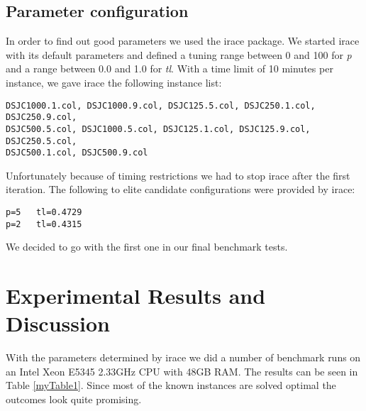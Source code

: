 \documentclass[a4paper]{scrartcl}
\begin{document}
\subsection{Parameter configuration}

In order to find out good parameters we used the irace package\cite{lopez2011irace}. We started irace with its default parameters and defined a tuning range between 0 and 100 for \emph{p} and a range between 0.0 and 1.0 for \emph{tl}.
With a time limit of 10 minutes per instance, we gave irace the following instance list:
\begin{verbatim}
DSJC1000.1.col, DSJC1000.9.col, DSJC125.5.col, DSJC250.1.col, DSJC250.9.col,
DSJC500.5.col, DSJC1000.5.col, DSJC125.1.col, DSJC125.9.col, DSJC250.5.col,
DSJC500.1.col, DSJC500.9.col
\end{verbatim}

Unfortunately because of timing restrictions we had to stop irace after the first iteration. The following to elite candidate configurations were provided by irace:

\begin{verbatim}
p=5   tl=0.4729
p=2   tl=0.4315
\end{verbatim}

We decided to go with the first one in our final benchmark tests.


\section{Experimental Results and Discussion}

With the parameters determined by irace we did a number of benchmark runs on an Intel Xeon E5345 2.33GHz CPU with 48GB RAM. The results can be seen in Table \ref{myTable1}.
Since most of the known instances are solved optimal the outcomes look quite promising.
\end{document}
